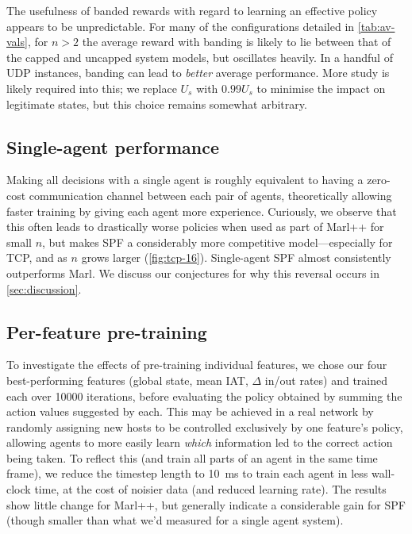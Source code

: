 \documentclass[conference, letterpaper, 10pt, times]{IEEEtran}
\begin{document}
The usefulness of banded rewards with regard to learning an effective policy appears to be unpredictable.
For many of the configurations detailed in \cref{tab:av-vals}, for $n>2$ the average reward with banding is likely to lie between that of the capped and uncapped system models, but oscillates heavily.
In a handful of UDP instances, banding can lead to \emph{better} average performance.
More study is likely required into this; we replace $U_s$ with $0.99U_s$ to minimise the impact on legitimate states, but this choice remains somewhat arbitrary.

\subsection{Single-agent performance}
Making all decisions with a single agent is roughly equivalent to having a zero-cost communication channel between each pair of agents, theoretically allowing faster training by giving each agent more experience.
Curiously, we observe that this often leads to drastically worse policies when used as part of Marl++ for small $n$, but makes SPF a considerably more competitive model---especially for TCP, and as $n$ grows larger (\cref{fig:tcp-16}).
Single-agent SPF almost consistently outperforms Marl.
We discuss our conjectures for why this reversal occurs in \cref{sec:discussion}.

\subsection{Per-feature pre-training}
To investigate the effects of pre-training individual features, we chose our four best-performing features (global state, mean IAT, $\Delta$ in/out rates) and trained each over \num{10000} iterations, before evaluating the policy obtained by summing the action values suggested by each.
This may be achieved in a real network by randomly assigning new hosts to be controlled exclusively by one feature's policy, allowing agents to more easily learn \emph{which} information led to the correct action being taken.
To reflect this (and train all parts of an agent in the same time frame), we reduce the timestep length to \SI{10}{\milli\second} to train each agent in less wall-clock time, at the cost of noisier data (and reduced learning rate).
The results show little change for Marl++, but generally indicate a considerable gain for SPF (though smaller than what we'd measured for a single agent system).
\end{document}
